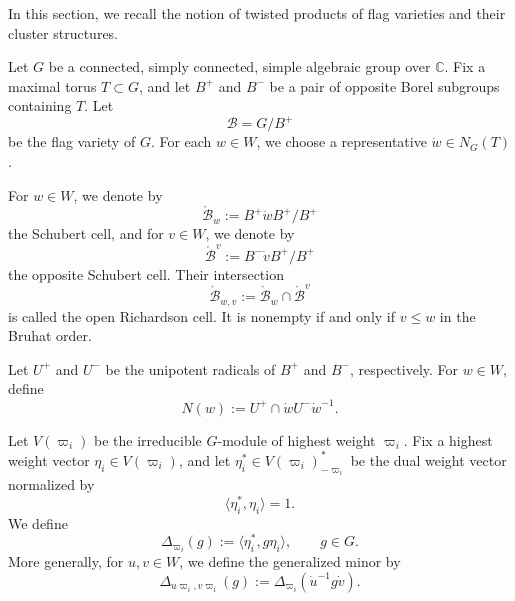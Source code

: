 \documentclass[12pt, reqno]{amsart}
\theoremstyle{plain}
\newtheorem{theorem}{Theorem}[section]
\theoremstyle{definition}
\numberwithin{equation}{section}
\newcommand{\CC}{\mathbb{C}}
\begin{document}
In this section, we recall the notion of twisted products of flag varieties and
their cluster structures.

Let \(G\) be a connected, simply connected, simple algebraic group over
\(\mathbb C\). Fix a maximal torus \(T\subset G\), and let \(B^+\) and \(B^-\)
be a pair of opposite Borel subgroups containing \(T\). Let
\[
\mathcal B=G/B^+
\]
be the flag variety of \(G\). For each \(w\in W\), we choose a representative
\(\dot w\in N_G(T)\).

For \(w\in W\), we denote by
\[
\mathring{\mathcal B}_w:=B^+\dot wB^+/B^+
\]
the Schubert cell, and for \(v\in W\), we denote by
\[
\mathring{\mathcal B}^v:=B^-\dot vB^+/B^+
\]
the opposite Schubert cell. Their intersection
\[
\mathring{\mathcal B}_{w,v}
:=
\mathring{\mathcal B}_w\cap \mathring{\mathcal B}^v
\]
is called the open Richardson cell. It is nonempty if and only if
\(v\le w\) in the Bruhat order.

Let \(U^+\) and \(U^-\) be the unipotent radicals of \(B^+\) and \(B^-\),
respectively. For \(w\in W\), define
\[
N(w):=U^+\cap \dot wU^-\dot w^{-1}.
\]

Let \(V(\varpi_i)\) be the irreducible \(G\)-module of highest weight
\(\varpi_i\). Fix a highest weight vector
\(\eta_i\in V(\varpi_i)\), and let
\(\eta_i^*\in V(\varpi_i)^*_{-\varpi_i}\) be the dual weight vector
normalized by
\[
\langle \eta_i^*,\eta_i\rangle=1.
\]
We define
\[
\Delta_{\varpi_i}(g)
:=
\langle \eta_i^*,g\eta_i\rangle,
\qquad g\in G.
\]
More generally, for \(u,v\in W\), we define the generalized minor by
\[
\Delta_{u\varpi_i,v\varpi_i}(g)
:=
\Delta_{\varpi_i}(\dot u^{-1}g\dot v).
\]


\end{document}
